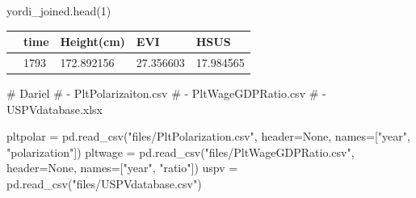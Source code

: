\documentclass[
  letterpaper,
  DIV=11,
  numbers=noendperiod]{scrartcl}
\newenvironment{Shaded}{\begin{snugshade}}{\end{snugshade}}
\newcommand{\CommentTok}[1]{\textcolor[rgb]{0.37,0.37,0.37}{#1}}
\newcommand{\DecValTok}[1]{\textcolor[rgb]{0.68,0.00,0.00}{#1}}
\newcommand{\NormalTok}[1]{\textcolor[rgb]{0.00,0.23,0.31}{#1}}
\newcommand{\OperatorTok}[1]{\textcolor[rgb]{0.37,0.37,0.37}{#1}}
\newcommand{\StringTok}[1]{\textcolor[rgb]{0.13,0.47,0.30}{#1}}
\newcommand{\VariableTok}[1]{\textcolor[rgb]{0.07,0.07,0.07}{#1}}
\begin{document}
\begin{Shaded}
\begin{Highlighting}[]
\NormalTok{yordi\_joined.head(}\DecValTok{1}\NormalTok{)}
\end{Highlighting}
\end{Shaded}

\begin{longtable}[]{@{}lllll@{}}
\toprule\noalign{}
& time & Height(cm) & EVI & HSUS \\
\midrule\noalign{}
\endhead
\bottomrule\noalign{}
\endlastfoot
0 & 1793 & 172.892156 & 27.356603 & 17.984565 \\
\end{longtable}

\begin{Shaded}
\begin{Highlighting}[]
\CommentTok{\# Dariel}
\CommentTok{\# {-} PltPolarizaiton.csv}
\CommentTok{\# {-} PltWageGDPRatio.csv}
\CommentTok{\# {-} USPVdatabase.xlsx}

\NormalTok{pltpolar }\OperatorTok{=}\NormalTok{ pd.read\_csv(}\StringTok{"files/PltPolarization.csv"}\NormalTok{, header}\OperatorTok{=}\VariableTok{None}\NormalTok{, names}\OperatorTok{=}\NormalTok{[}\StringTok{"year"}\NormalTok{, }\StringTok{"polarization"}\NormalTok{])}
\NormalTok{pltwage }\OperatorTok{=}\NormalTok{ pd.read\_csv(}\StringTok{"files/PltWageGDPRatio.csv"}\NormalTok{, header}\OperatorTok{=}\VariableTok{None}\NormalTok{, names}\OperatorTok{=}\NormalTok{[}\StringTok{"year"}\NormalTok{, }\StringTok{"ratio"}\NormalTok{])}
\NormalTok{uspv }\OperatorTok{=}\NormalTok{ pd.read\_csv(}\StringTok{"files/USPVdatabase.csv"}\NormalTok{)}
\end{Highlighting}
\end{Shaded}
\end{document}
